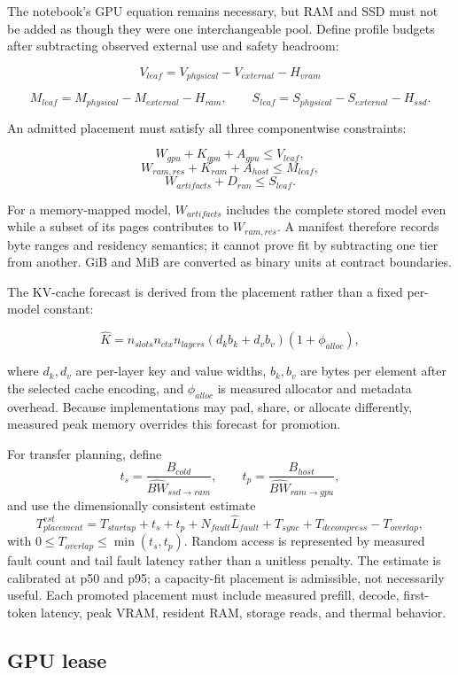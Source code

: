\documentclass[11pt,letterpaper]{article}
\begin{document}
The notebook's GPU equation remains necessary, but RAM and SSD must not be added
as though they were one interchangeable pool. Define profile budgets after
subtracting observed external use and safety headroom:

\[
V_{leaf}=V_{physical}-V_{external}-H_{vram}
\]

\[
M_{leaf}=M_{physical}-M_{external}-H_{ram},
\qquad
S_{leaf}=S_{physical}-S_{external}-H_{ssd}.
\]

An admitted placement must satisfy all three componentwise constraints:

\[
W_{gpu}+K_{gpu}+A_{gpu}\leq V_{leaf},
\]
\[
W_{ram,res}+K_{ram}+A_{host}\leq M_{leaf},
\]
\[
W_{artifacts}+D_{run}\leq S_{leaf}.
\]

For a memory-mapped model, \(W_{artifacts}\) includes the complete stored model
even while a subset of its pages contributes to \(W_{ram,res}\). A manifest
therefore records byte ranges and residency semantics; it cannot prove fit by
subtracting one tier from another. GiB and MiB are converted as binary units at
contract boundaries.

The KV-cache forecast is derived from the placement rather than a fixed
per-model constant:

\[
\widehat{K} =
n_{slots}n_{ctx}n_{layers}
\left(d_k b_k+d_v b_v\right)
\left(1+\phi_{alloc}\right),
\]

where \(d_k,d_v\) are per-layer key and value widths, \(b_k,b_v\) are bytes per
element after the selected cache encoding, and \(\phi_{alloc}\) is measured
allocator and metadata overhead. Because implementations may pad, share, or
allocate differently, measured peak memory overrides this forecast for
promotion.

For transfer planning, define
\[
t_s=\frac{B_{cold}}{\widehat{BW}_{ssd\rightarrow ram}},
\qquad
t_p=\frac{B_{host}}{\widehat{BW}_{ram\rightarrow gpu}},
\]
and use the dimensionally consistent estimate
\[
T_{placement}^{est} =
T_{startup}+t_s+t_p
+N_{fault}\widehat{L}_{fault}
+T_{sync}+T_{decompress}-T_{overlap},
\]
with \(0\leq T_{overlap}\leq\min(t_s,t_p)\). Random access is represented by
measured fault count and tail fault latency rather than a unitless penalty. The
estimate is calibrated at p50 and p95; a capacity-fit placement is admissible,
not necessarily useful. Each promoted placement must include measured prefill,
decode, first-token latency, peak VRAM, resident RAM, storage reads, and thermal
behavior.

\subsection{GPU lease}
\end{document}

